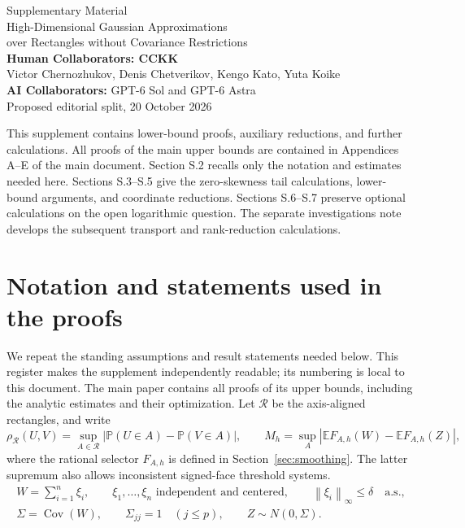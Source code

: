 \documentclass[11pt,a4paper]{article}
\theoremstyle{remark}
\newcommand{\E}{\mathbb E}
\newcommand{\Pp}{\mathbb P}
\newcommand{\Cov}{\operatorname{Cov}}
\newcommand{\norm}[1]{\left\lVert#1\right\rVert}
\newcommand{\rh}{\rho_{\mathcal R}}
\begin{document}
\begin{center}
{\Large Supplementary Material}\\[.4em]
{\large High-Dimensional Gaussian Approximations\\
over Rectangles without Covariance Restrictions}\\[.75em]
{\normalsize\textbf{Human Collaborators: CCKK}}\\[.2em]
{\normalsize Victor Chernozhukov, Denis Chetverikov, Kengo Kato, Yuta Koike}\\[.5em]
{\normalsize\textbf{AI Collaborators:} GPT-6 Sol and GPT-6 Astra}\\[.6em]
{\small Proposed editorial split, 20 October 2026}
\end{center}
\noindent
This supplement contains lower-bound proofs, auxiliary reductions, and
further calculations. All proofs of the main upper bounds are contained
in Appendices A--E of the main document. Section S.2 recalls only the
notation and estimates needed here. Sections S.3--S.5 give the
zero-skewness tail calculations, lower-bound arguments, and coordinate
reductions. Sections S.6--S.7 preserve optional calculations on the open
logarithmic question. The separate investigations note develops the
subsequent transport and rank-reduction calculations.
\tableofcontents

\section{Notation and statements used in the proofs}\label{sec:results}
We repeat the standing assumptions and result statements needed below.
This register makes the supplement independently readable; its numbering
is local to this document. The main paper contains all proofs of its
upper bounds, including the analytic estimates and their optimization.
Let \(\mathcal R\) be the axis-aligned rectangles, and write
\[
 \rh(U,V)=\sup_{A\in\mathcal R}
 |\Pp(U\in A)-\Pp(V\in A)|,\qquad
 M_h=\sup_A|\E F_{A,h}(W)-\E F_{A,h}(Z)|,
\]
where the rational selector \(F_{A,h}\) is defined in
Section~\ref{sec:smoothing}. The latter supremum also allows
inconsistent signed-face threshold systems.
\begin{equation}
 \begin{gathered}
 W=\sum_{i=1}^n\xi_i,\qquad
 \xi_1,\ldots,\xi_n\text{ independent and centered},\qquad
 \norm{\xi_i}_\infty\le\delta\quad\text{a.s.},\\
 \Sigma=\Cov(W),\qquad \Sigma_{jj}=1\quad(j\le p),
 \qquad Z\sim N(0,\Sigma).
 \end{gathered}
 \label{eq:setup}
\end{equation}
\end{document}
